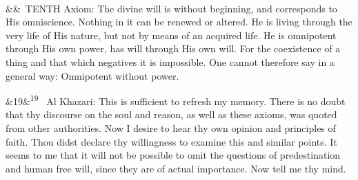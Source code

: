 \documentclass[12pt]{article}
\newcommand{\para}[1][]{\par\noindent\ifx&#1&\else\textsuperscript{\footnotesize #1}~\fi}
\begin{document}
\para TENTH Axiom: The divine will is without beginning, and corresponds to His omniscience. Nothing in it can be renewed or altered. He is living through the very life of His nature, but not by means of an acquired life. He is omnipotent through His own power, has will through His own will. For the coexistence of a thing and that which negatives it is impossible. One cannot therefore say in a general way: Omnipotent without power.

\para[19] Al Khazari: This is sufficient to refresh my memory. There is no doubt that thy discourse on the soul and reason, as well as these axioms, was quoted from other authorities. Now I desire to hear thy own opinion and principles of faith. Thou didst declare thy willingness to examine this and similar points. It seems to me that it will not be possible to omit the questions of predestination and human free will, since they are of actual importance. Now tell me thy mind.
\end{document}
